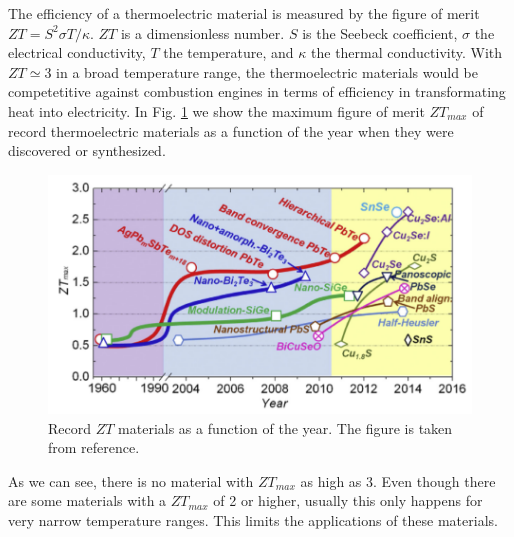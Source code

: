 The efficiency of a thermoelectric material is measured by the figure of merit $ZT=S^{2}\sigma T/\kappa$. $ZT$ is 
a dimensionless number. $S$ is the Seebeck coefficient, $\sigma$ the electrical conductivity, $T$ the temperature, 
and $\kappa$ the thermal conductivity. With $ZT\simeq3$ in a broad temperature range, the thermoelectric materials 
would be competetitive against combustion engines in terms of efficiency in transformating heat into 
electricity\cite{zhang2015thermoelectric}. In Fig. \ref{ztvst} we show the maximum figure of merit $ZT_{max}$ of 
record thermoelectric materials as a function of the year when they were discovered or synthesized.
\begin{figure}[h]
\begin{center}
\includegraphics[width=0.9\linewidth]{Figures/ztvstemp.png}
\caption[Record $ZT$ materials]{Record $ZT$ materials as a function of the year. The figure is taken from 
reference\cite{zhang2015thermoelectric}.}
\label{ztvst}
\end{center}
\end{figure}
As we can see, there is no material with $ZT_{max}$ as high as 3. Even though there are some materials with a 
$ZT_{max}$ of 2 or higher, usually this only happens for very narrow temperature ranges\cite{zhao2014ultralow}. This 
limits the applications of these materials. \\

